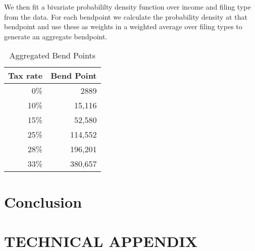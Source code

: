 \documentclass[letterpaper,12pt]{article}
\theoremstyle{definition}
\numberwithin{equation}{section}
\begin{document}
\begin{spacing}{1.5}
      We then fit a bivariate probabililty density function over income and filing type from the data.  For each bendpoint we calculate the probability density at that bendpoint and use these as weights in a weighted average over filing types to generate an aggregate bendpoint.
      \begin{table}[ht]
        \caption{Aggregated Bend Points}
        \label{Calib_Bend_Tab2}
        \centering
        \begin{tabular}{|r|r|} \hline 
          Tax rate & Bend Point \\ \hline 
          0\% & 2889 \\ \hline 
          10\% & 15,116 \\ \hline 
          15\% & 52,580 \\ \hline 
          25\% & 114,552 \\ \hline 
          28\% & 196,201 \\ \hline 
          33\% & 380,657 \\ \hline 
        \end{tabular}
      \end{table}

\section{Conclusion}\label{SecConclusion}


\end{spacing}


\newpage
\renewcommand{\theequation}{A.\arabic{section}.\arabic{equation}}
\renewcommand{\thedefinition}{A.\arabic{section}.\arabic{definition}}
\renewcommand{\thesection}{A-\arabic{section}}   %

\setcounter{equation}{0}                         %
\setcounter{section}{0}                          %
\section*{TECHNICAL APPENDIX}

\setcounter{definition}{0}
\setcounter{equation}{0}                         %




\newpage

\end{document}
